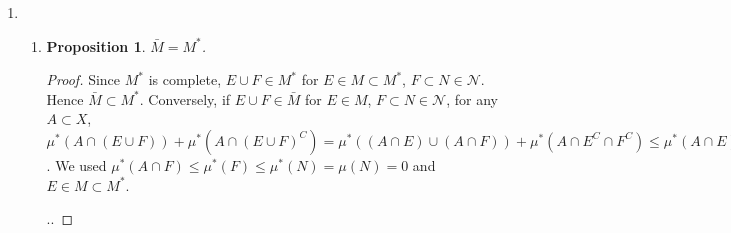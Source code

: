 \documentclass{book}
\newtheorem*{proposition*}{Proposition}
\begin{document}
\begin{enumerate}[label=\arabic*.,font=\bfseries]
	\item \begin{enumerate}
		      \item \begin{proposition*}
			            $\bar M = M^*$.
		            \end{proposition*}


		            \begin{proof}
			            Since $M^*$ is complete,
			            $E\cup F\in M^*$ for $E\in M \subset M^*$,
			            $F\subset N\in \mathcal N$.
			            Hence $\bar M \subset M^*$.
			            Conversely, if $E\cup F \in \bar M$ for $E\in M$,
			            $F\subset N\in \mathcal N$,
			            for any $A\subset X$,
			            $\mu^*(A\cap(E\cup F))+\mu^*(A\cap(E\cup F)^C)
				            =\mu^*((A\cap E)\cup (A\cap F))+\mu^*(A\cap E^C \cap F^C)
				            \le \mu^*(A\cap E)+\mu^*(A\cap F)+\mu^*(A\cap E^C)
				            =\mu^*(A)$.
			            We used $\mu^*(A\cap F)\le \mu^*(F)\le \mu^*(N)=\mu(N)=0$ and $E\in M\subset M^*$.

			            ..
		            \end{proof}
	      \end{enumerate}


\end{enumerate}
\end{document}
